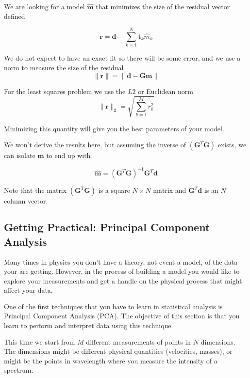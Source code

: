 \documentclass{article}
\begin{document}
We are looking for a model $\hat{\mathbf{m}}$ that minimizes the size of the residual vector defined

\begin{equation}
\mathbf{r} = \mathbf{d} -  \sum_{k=1}^{N} \mathbf{t}_k \hat{m}_k
\end{equation}

We do not expect to have an exact fit so there will be some error, and we use a norm to measure the size of the residual
\begin{equation}
\| \mathbf{r} \| = \| \mathbf{d} - \mathbf{Gm} \|
\end{equation}

For the least squares problem we use the $L2$ or Euclidean norm 
\begin{equation}
\| \mathbf{r} \|_2 = \sqrt{\sum_{k=1}^M r^2_k}
\end{equation}

Minimizing this quantity will give you the best parameters of your model.


We won't derive the results here, but assuming the inverse of $(\mathbf{G}^T \mathbf{G})$ exists, we can isolate $\hat{\mathbf{m}}$ to end up with

\begin{equation}
\hat{\mathbf{m}} = {(\mathbf{G}^T \mathbf{G})}^{-1}\mathbf{G}^T \mathbf{d}   
\end{equation}

Note that the matrix ${(\mathbf{G}^T \mathbf{G})}$ is a square $N\times N$ matrix and $\mathbf{G}^T\mathbf{d}$ is an $N$ column vector. 

\subsection{Getting Practical: Principal Component Analysis}

Many times in physics you don't have a theory, not event a model, of the data your are getting. However, in the process of building a model you would like to explore your measurements and get a handle on the physical process that might affect your data.

One of the first techniques that you have to learn in statistical analysis is Principal Component Analysis (PCA). The objective of this section is that you learn to perform and interpret data using this technique.

This time we start from $M$ different measurements of points in $N$ dimensions. The dimensions might be different physical quantities (velocities, masses), or might be the points in wavelength where you measure the intensity of a spectrum.
\end{document}
